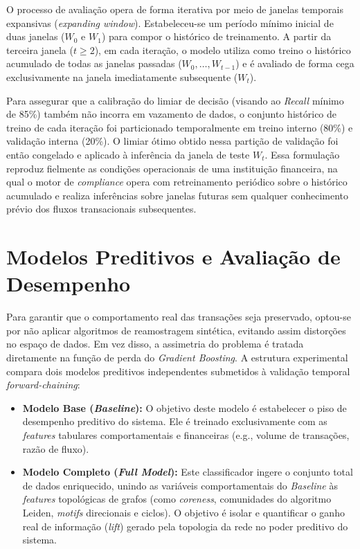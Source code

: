 \documentclass[a4paper,12pt,oneside,onecolumn,final,fleqn]{repUERJ}
\begin{document}
O processo de avaliação opera de forma iterativa por meio de janelas temporais expansivas (\textit{expanding window}). Estabeleceu-se um período mínimo inicial de duas janelas ($W_0$ e $W_1$) para compor o histórico de treinamento. A partir da terceira janela ($t \ge 2$), em cada iteração, o modelo utiliza como treino o histórico acumulado de todas as janelas passadas ($W_0, \dots, W_{t-1}$) e é avaliado de forma cega exclusivamente na janela imediatamente subsequente ($W_t$).

Para assegurar que a calibração do limiar de decisão (visando ao \textit{Recall} mínimo de 85\%) também não incorra em vazamento de dados, o conjunto histórico de treino de cada iteração foi particionado temporalmente em treino interno (80\%) e validação interna (20\%). O limiar ótimo obtido nessa partição de validação foi então congelado e aplicado à inferência da janela de teste $W_t$. Essa formulação reproduz fielmente as condições operacionais de uma instituição financeira, na qual o motor de \textit{compliance} opera com retreinamento periódico sobre o histórico acumulado e realiza inferências sobre janelas futuras sem qualquer conhecimento prévio dos fluxos transacionais subsequentes.

\section{Modelos Preditivos e Avaliação de Desempenho} 

Para garantir que o comportamento real das transações seja preservado, optou-se por não aplicar algoritmos de reamostragem sintética, evitando assim distorções no espaço de dados. Em vez disso, a assimetria do problema é tratada diretamente na função de perda do \textit{Gradient Boosting}. A estrutura experimental compara dois modelos preditivos independentes submetidos à validação temporal \textit{forward-chaining}:

\begin{itemize}
    \item \textbf{Modelo Base (\textit{Baseline}):} O objetivo deste modelo é estabelecer o piso de desempenho preditivo do sistema. Ele é treinado exclusivamente com as \textit{features} tabulares comportamentais e financeiras (e.g., volume de transações, razão de fluxo).
    
    \item \textbf{Modelo Completo (\textit{Full Model}):} Este classificador ingere o conjunto total de dados enriquecido, unindo as variáveis comportamentais do \textit{Baseline} às \textit{features} topológicas de grafos (como \textit{coreness}, comunidades do algoritmo Leiden, \textit{motifs} direcionais e ciclos). O objetivo é isolar e quantificar o ganho real de informação (\textit{lift}) gerado pela topologia da rede no poder preditivo do sistema.
\end{itemize}
\end{document}
